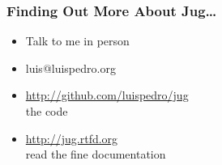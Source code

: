 \documentclass{beamer}
\begin{document}
\begin{frame}[fragile]
\frametitle{Finding Out More About Jug\ldots}
\begin{itemize}
\item Talk to me \alert{in person}
\item luis@luispedro.org
\item \url{http://github.com/luispedro/jug}\\the code
\item \url{http://jug.rtfd.org}\\read the fine documentation
\end{itemize}

\end{frame}
\end{document}

